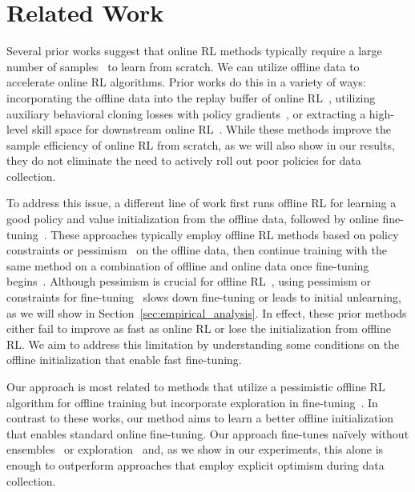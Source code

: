 \vspace{-0.2cm}
\section{Related Work}
\vspace{-0.3cm}
Several prior works suggest that online RL methods typically require a large number of samples~\cite{silver2016mastering,vinyals2019grandmaster,ye2020towards,kakade2002approximately,zhai2022computational,gupta2022unpacking,li2022understanding} to learn from scratch. We can utilize offline data to accelerate online RL algorithms. Prior works do this in a variety of ways: incorporating the offline data into the replay buffer of online RL~\cite{schaal1996learning,vecerik2017leveraging,hester2018deep,song2023hybrid}, utilizing auxiliary behavioral cloning losses with policy gradients~\cite{rajeswaran2017learning,kang2018policy,zhu2018reinforcement,zhu2019dexterous}, or extracting a high-level skill space for downstream online RL~\cite{gupta2019relay,ajay2020opal}. While these methods improve the sample efficiency of online RL from scratch, as we will also show in our results, they do not eliminate the need to actively roll out poor policies for data collection.

To address this issue, a different line of work first runs offline RL for learning a good policy and value initialization from the offline data, followed by online fine-tuning~\cite{nair2020accelerating,kostrikov2021offlineb,lyu2022mildly,beeson2022improving,wu2022supported,lee2022offline,mark2022fine}. These approaches typically employ offline RL methods based on policy constraints or pessimism~\cite{fujimoto2018off,siegel2020keep,guo2020batch,ghasemipour2021emaq,kostrikov2021offlineb,singh2020cog,lee2022offline} on the offline data, then continue training with the same method on a combination of offline and online data once fine-tuning begins~\cite{nachum2019algaedice,kidambi2020morel,yu2020mopo,kumar2020conservative,buckman2020importance}. Although pessimism is crucial for offline RL~\cite{jin2021pessimism,cheng2022adversarially}, using pessimism or constraints for fine-tuning~\cite{nair2020accelerating,kostrikov2021offlineb,lyu2022mildly} slows down fine-tuning or leads to initial unlearning, as we will show in Section~\ref{sec:empirical_analysis}. In effect, these prior methods either fail to improve as fast as online RL or lose the initialization from offline RL. We aim to address this limitation by understanding some conditions on the offline initialization that enable fast fine-tuning. 

Our approach is most related to methods that utilize a pessimistic offline RL algorithm for offline training but incorporate exploration in fine-tuning~\cite{lee2022offline,mark2022fine,wu2022supported}. In contrast to these works, our method aims to learn a better offline initialization that enables standard online fine-tuning. Our approach fine-tunes na\"ively without ensembles~\cite{lee2022offline} or exploration~\cite{mark2022fine} and, as we show in our experiments, this alone is enough to outperform approaches that employ explicit optimism during data collection.
